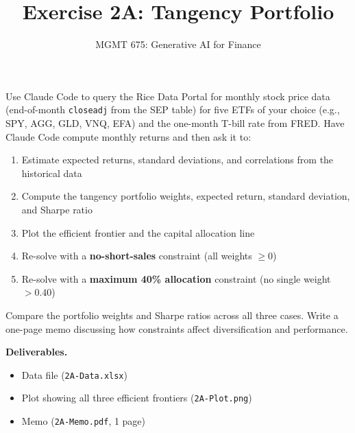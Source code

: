 \documentclass[
  letterpaper,
  DIV=11,
  numbers=noendperiod]{scrartcl}
\title{Exercise 2A: Tangency Portfolio}
\subtitle{MGMT 675: Generative AI for Finance}
\author{}
\date{}
\providecommand{\tightlist}{%
  \setlength{\itemsep}{0pt}\setlength{\parskip}{0pt}}\usepackage{longtable,booktabs,array}
\begin{document}
\maketitle


Use Claude Code to query the Rice Data Portal for monthly stock price
data (end-of-month \texttt{closeadj} from the SEP table) for five ETFs
of your choice (e.g., SPY, AGG, GLD, VNQ, EFA) and the one-month T-bill
rate from FRED. Have Claude Code compute monthly returns and then ask it
to:

\begin{enumerate}
\def\labelenumi{(\alph{enumi})}
\tightlist
\item
  Estimate expected returns, standard deviations, and correlations from
  the historical data
\item
  Compute the tangency portfolio weights, expected return, standard
  deviation, and Sharpe ratio
\item
  Plot the efficient frontier and the capital allocation line
\item
  Re-solve with a \textbf{no-short-sales} constraint (all weights
  \(\geq 0\))
\item
  Re-solve with a \textbf{maximum 40\% allocation} constraint (no single
  weight \(> 0.40\))
\end{enumerate}

Compare the portfolio weights and Sharpe ratios across all three cases.
Write a one-page memo discussing how constraints affect diversification
and performance.

\bigskip

\noindent\textbf{Deliverables.}

\begin{itemize}
\tightlist
\item
  Data file (\texttt{2A-Data.xlsx})
\item
  Plot showing all three efficient frontiers (\texttt{2A-Plot.png})
\item
  Memo (\texttt{2A-Memo.pdf}, 1 page)
\end{itemize}
\end{document}
